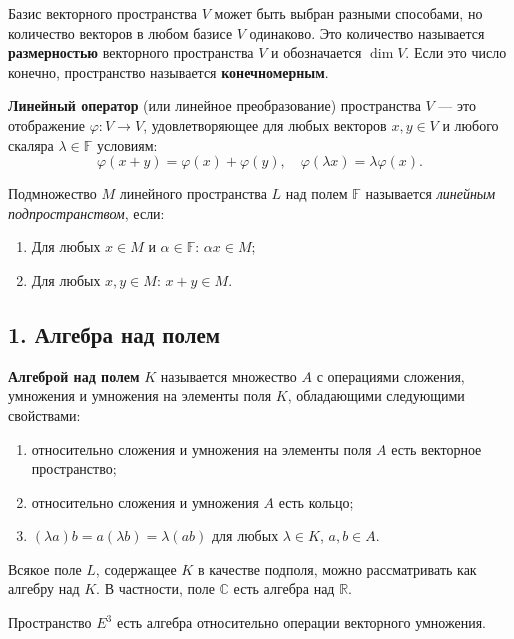 Базис векторного пространства $V$ может быть выбран разными способами, но количество векторов в любом базисе $V$ одинаково. Это количество называется \textbf{размерностью} векторного пространства $V$ и обозначается $\dim V$. Если это число конечно, пространство называется \textbf{конечномерным}.

\begin{definition}
\textbf{Линейный оператор} (или линейное преобразование) пространства $V$ — это отображение $\varphi : V \to V$, удовлетворяющее для любых векторов $x, y \in V$ и любого скаляра $\lambda \in \mathbb{F}$ условиям:
$$ \varphi(x + y) = \varphi(x) + \varphi(y), \quad \varphi(\lambda x) = \lambda\varphi(x). $$
\end{definition}

\begin{definition}
    Подмножество $M$ линейного пространства $L$ над полем $\mathbb{F}$ называется \textit{линейным подпространством}, если:
\begin{enumerate}
    \item[1)] Для любых $x \in M$ и $\alpha \in \mathbb{F}$: $\alpha x \in M$;
    \item[2)] Для любых $x, y \in M$: $x + y \in M$.
\end{enumerate}

\end{definition}

\subsection*{1. Алгебра над полем}

\begin{definition}
\textbf{Алгеброй над полем} $K$ называется множество $A$ с операциями сложения, 
умножения и умножения на элементы поля $K$, обладающими следующими свойствами:
\begin{enumerate}
    \item[1)] относительно сложения и умножения на элементы поля $A$ есть векторное пространство;
    \item[2)] относительно сложения и умножения $A$ есть кольцо;
    \item[3)] $(\lambda a)b = a(\lambda b) = \lambda(ab)$ для любых $\lambda \in K$, $a, b \in A$.
\end{enumerate}

\begin{example}
Всякое поле $L$, содержащее $K$ в качестве подполя, можно 
рассматривать как алгебру над $K$. В частности, поле $\mathbb{C}$ есть алгебра над $\mathbb{R}$.
\end{example}

\begin{example}
Пространство $E^3$ есть алгебра относительно операции векторного умножения.
\end{example}

\end{definition}


